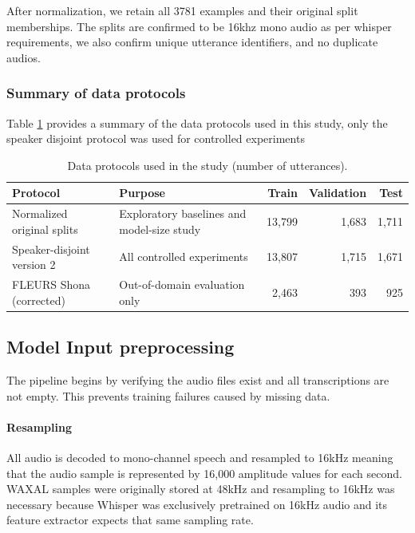 {After normalization, we retain all 3781 examples and their original split memberships. The splits are confirmed to be 16khz mono audio as per whisper requirements, we also confirm unique utterance identifiers, and no duplicate audios. 

\subsubsection{Summary of data protocols}

Table \ref{tab:protocols} provides a summary of the data protocols used in this study, only the speaker disjoint protocol was used for controlled experiments


\begin{table}[H]
    \centering
    \begin{tabular}{|p{4.2cm}|p{4.2cm}|r|r|r|}
        \hline
        Protocol & Purpose & Train & Validation & Test \\
        \hline
        Normalized original splits & Exploratory baselines and model-size study & 13,799 & 1,683 & 1,711 \\
        \hline
        Speaker-disjoint version 2 & All controlled experiments & 13,807 & 1,715 & 1,671 \\
        \hline
        FLEURS Shona (corrected) & Out-of-domain evaluation only & 2,463 & 393 & 925 \\
        \hline
    \end{tabular}
    \caption{Data protocols used in the study (number of utterances).}
    \label{tab:protocols}
\end{table}

\subsection{Model Input preprocessing}

The pipeline begins by verifying the audio files exist and all transcriptions are not empty. This prevents training failures caused by missing data. 
\paragraph{Resampling}
All audio is decoded to mono-channel speech and resampled to 16kHz meaning that the audio sample is represented by 16,000 amplitude values for each second. WAXAL samples were originally stored at 48kHz and resampling to 16kHz was necessary because Whisper was exclusively pretrained on 16kHz audio and its feature extractor expects that same sampling rate.

}
